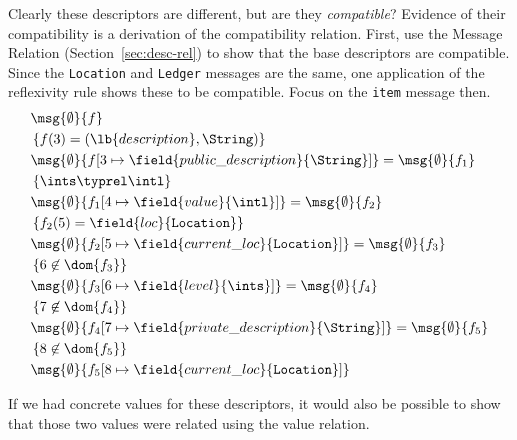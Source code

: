 Clearly these descriptors are different, but are they \emph{compatible}?
Evidence of their compatibility is a derivation of the compatibility relation.
First, use the Message Relation (Section~\ref{sec:desc-rel}) to show that the base
descriptors are compatible. Since the \texttt{Location} and \texttt{Ledger}
messages are the same, one application of the reflexivity rule shows these to be
compatible. Focus on the \texttt{item} message then. 
\begin{align*}
  &\msg{\emptyset}{f} \\
  &\left\{f(3) = (\lb{description}, \String) \right\} \\
  &\msg{\emptyset}{f[3 \mapsto \field{public\_description}{\String}]} = \msg{\emptyset}{f_1} \\
  &\left\{ \ints \typrel \intl \right\} \\
  &\msg{\emptyset}{f_1[4 \mapsto \field{value}{\intl}]} = \msg{\emptyset}{f_2} \\
  &\left\{ f_2(5) = \field{loc}{\mathtt{Location}} \right\} \\
  &\msg{\emptyset}{f_2[5 \mapsto \field{current\_loc}{\mathtt{Location}}]} = \msg{\emptyset}{f_3} \\
  &\left\{ 6 \not \in \dom{f_3} \right\} \\
  &\msg{\emptyset}{f_3[6 \mapsto \field{level}{\ints}]} = \msg{\emptyset}{f_4} \\
  &\left\{ 7 \not \in \dom{f_4} \right\} \\
  &\msg{\emptyset}{f_4[7 \mapsto \field{private\_description}{\String}]} = \msg{\emptyset}{f_5} \\
  &\left\{ 8 \not \in \dom{f_5} \right\} \\
  &\msg{\emptyset}{f_5[8 \mapsto \field{current\_loc}{\mathtt{Location}}]}
\end{align*}

If we had concrete values for these descriptors, it would also be possible to
show that those two values were related using the value relation.

